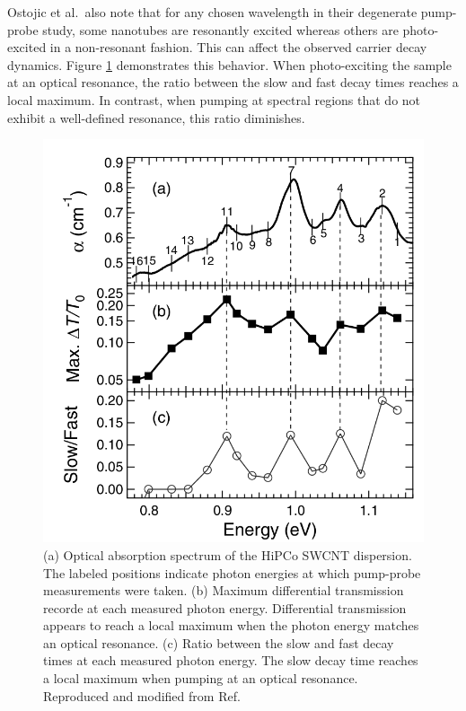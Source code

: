Ostojic et al.\  also note that for any chosen wavelength in their degenerate pump-probe study, some nanotubes are resonantly excited whereas others are photo-excited in a non-resonant fashion. This can affect the observed carrier decay dynamics. Figure \ref{fig:wl_dep_gordana} demonstrates this behavior. When photo-exciting the sample at an optical resonance, the ratio between the slow and fast decay times reaches a local maximum. In contrast, when pumping at spectral regions that do not exhibit a well-defined resonance, this ratio diminishes.

\begin{figure}[ht]
	\centering
	\includegraphics[scale=0.3]{images/chapter_prior_works/wavelength_dependence_gordana}
	\caption{(a) Optical absorption spectrum of the HiPCo SWCNT dispersion. The labeled positions indicate photon energies at which pump-probe measurements were taken. (b) Maximum differential transmission recorde at each measured photon energy. Differential transmission appears to reach a local maximum when the photon energy matches an optical resonance. (c) Ratio between the slow and fast decay times at each measured photon energy. The slow decay time reaches a local maximum when pumping at an optical resonance. Reproduced and modified from Ref.\ \cite{ostojic2004interband}}
	\label{fig:wl_dep_gordana}
\end{figure}

